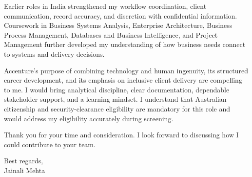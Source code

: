 \documentclass[letterpaper,10pt]{article}
\begin{document}
Earlier roles in India strengthened my workflow coordination, client communication, record accuracy, and discretion with confidential information. Coursework in Business Systems Analysis, Enterprise Architecture, Business Process Management, Databases and Business Intelligence, and Project Management further developed my understanding of how business needs connect to systems and delivery decisions.

Accenture's purpose of combining technology and human ingenuity, its structured career development, and its emphasis on inclusive client delivery are compelling to me. I would bring analytical discipline, clear documentation, dependable stakeholder support, and a learning mindset. I understand that Australian citizenship and security-clearance eligibility are mandatory for this role and would address my eligibility accurately during screening.

Thank you for your time and consideration. I look forward to discussing how I could contribute to your team.

Best regards,\\[8pt]
Jainali Mehta
\end{document}
